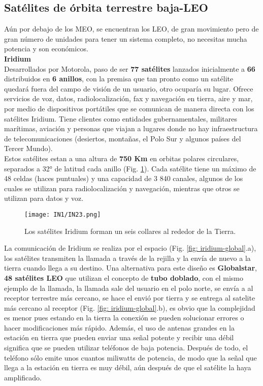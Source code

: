 \documentclass[
	12pt, %
	fleqn, %
	a4paper, %
]{LegrandOrangeBook}
\begin{document}
\subsection{Satélites de órbita terrestre baja-LEO}
Aún por debajo de los MEO, se encuentran los LEO, de gran movimiento pero de gran número de unidades para tener un sistema completo, no necesitas mucha potencia y son económicos.\\
\textbf{Iridium}\\
Desarrollados por Motorola, paso de ser \textbf{77 satélites} lanzados inicialmente a \textbf{66} distribuidos en \textbf{6 anillos},  con la premisa que tan pronto como un satélite quedará fuera del campo de visión de un usuario, otro ocuparía su lugar. Ofrece servicios de voz, datos, radiolocalización, fax y navegación en tierra, aire y mar, por medio de dispositivos portátiles que se comunican de manera directa con los satélites Iridium. Tiene clientes como entidades gubernamentales, militares marítimas, aviación y personas que viajan a lugares donde no hay infraestructura de telecomunicaciones (desiertos, montañas, el Polo Sur y algunos países del Tercer Mundo).\\
Estos satélites estan a una altura de \textbf{750 Km} en orbitas polares circulares, separados a 32° de latitud cada anillo (Fig. \ref{fig: iridium}). Cada satélite tiene un máximo de 48 celdas (haces puntuales) y una capacidad de 3 840 canales, algunos de los cuales se utilizan para radiolocalización y navegación, mientras que otros se utilizan para datos y voz.
\begin{figure}[H]
\centering
\texttt{[image: IN1/IN23.png]}
\caption{Los satélites Iridium forman un seis collares al rededor de la Tierra.}
\label{fig: iridium}
\end{figure}
La comunicación de Iridium se realiza por el espacio (Fig. \ref{fig: iridium-global}.a), los satélites transmiten la llamada a través de la rejilla y la envía de nuevo a la tierra cuando llega a su destino. Una alternativa para este diseño es \textbf{Globalstar}, \textbf{48 satélites LEO} que utilizan el concepto de \textbf{tubo doblado}, con el mismo ejemplo de la llamada, la llamada sale del usuario en el polo norte, se envía a al receptor terrestre más cercano, se hace el envió por tierra y se entrega al satelite más cercano al receptor (Fig. \ref{fig: iridium-global}.b), es obvio que la complejidad es menor pues estando en la tierra la conexión se pueden solucionar errores o hacer modificaciones más rápido. Además, el uso de antenas grandes en la estación en tierra que pueden enviar una señal potente y recibir una débil significa que se pueden utilizar teléfonos de baja potencia. Después de todo, el teléfono sólo emite unos cuantos miliwatts de potencia, de modo que la señal que llega a la estación en tierra es muy débil, aún después de que el satélite la haya amplificado.
\end{document}
